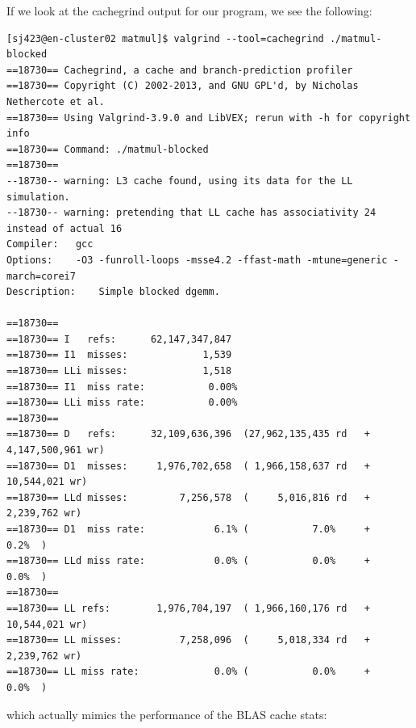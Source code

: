 \documentclass{article}
\begin{document}
    If we look at the cachegrind output for our program, we see the following:
    \begin{lstlisting}
[sj423@en-cluster02 matmul]$ valgrind --tool=cachegrind ./matmul-blocked
==18730== Cachegrind, a cache and branch-prediction profiler
==18730== Copyright (C) 2002-2013, and GNU GPL'd, by Nicholas Nethercote et al.
==18730== Using Valgrind-3.9.0 and LibVEX; rerun with -h for copyright info
==18730== Command: ./matmul-blocked
==18730== 
--18730-- warning: L3 cache found, using its data for the LL simulation.
--18730-- warning: pretending that LL cache has associativity 24 instead of actual 16
Compiler:	gcc
Options:	-O3 -funroll-loops -msse4.2 -ffast-math -mtune=generic -march=corei7
Description:	Simple blocked dgemm.

==18730== 
==18730== I   refs:      62,147,347,847
==18730== I1  misses:             1,539
==18730== LLi misses:             1,518
==18730== I1  miss rate:           0.00%
==18730== LLi miss rate:           0.00%
==18730== 
==18730== D   refs:      32,109,636,396  (27,962,135,435 rd   + 4,147,500,961 wr)
==18730== D1  misses:     1,976,702,658  ( 1,966,158,637 rd   +    10,544,021 wr)
==18730== LLd misses:         7,256,578  (     5,016,816 rd   +     2,239,762 wr)
==18730== D1  miss rate:            6.1% (           7.0%     +           0.2%  )
==18730== LLd miss rate:            0.0% (           0.0%     +           0.0%  )
==18730== 
==18730== LL refs:        1,976,704,197  ( 1,966,160,176 rd   +    10,544,021 wr)
==18730== LL misses:          7,258,096  (     5,018,334 rd   +     2,239,762 wr)
==18730== LL miss rate:             0.0% (           0.0%     +           0.0%  )
    \end{lstlisting}

    which actually mimics the performance of the BLAS cache stats:
\end{document}
